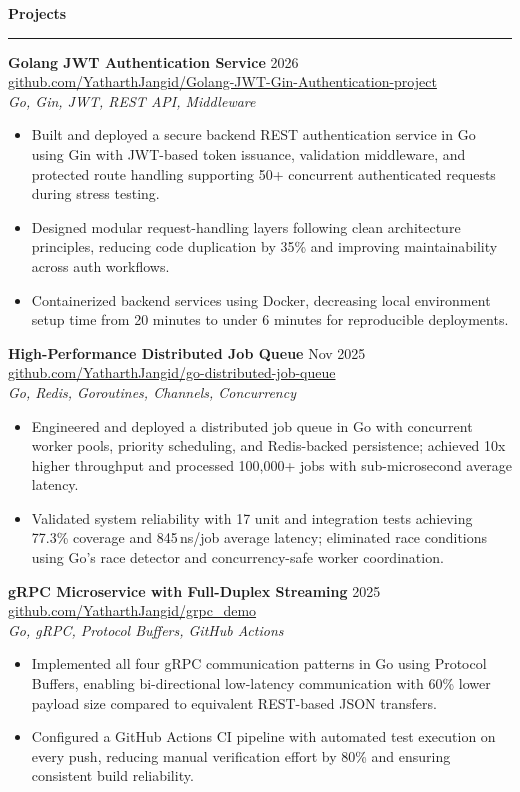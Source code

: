 \documentclass[10pt,a4paper]{article}
\newcommand{\ressection}[1]{%
  \vspace{3pt}%
  {\bfseries\normalsize #1}%
  \vspace{1pt}\hrule\vspace{2pt}%
}
\begin{document}
\ressection{Projects}

\textbf{Golang JWT Authentication Service} \hfill 2026 \hfill
\href{https://github.com/YatharthJangid/Golang-JWT-Gin-Authentication-project}%
     {\small github.com/YatharthJangid/Golang-JWT-Gin-Authentication-project} \\
\textit{Go, Gin, JWT, REST API, Middleware}
\begin{itemize}
  \item Built and deployed a secure backend REST authentication service in Go using Gin with JWT-based
        token issuance, validation middleware, and protected route handling supporting
        50+ concurrent authenticated requests during stress testing.
  \item Designed modular request-handling layers following clean architecture principles,
        reducing code duplication by 35\% and improving maintainability across auth workflows.
  \item Containerized backend services using Docker, decreasing local environment setup
        time from 20 minutes to under 6 minutes for reproducible deployments.
\end{itemize}

\textbf{High-Performance Distributed Job Queue} \hfill Nov 2025 \hfill
\href{https://github.com/YatharthJangid/go-distributed-job-queue}%
     {\small github.com/YatharthJangid/go-distributed-job-queue} \\
\textit{Go, Redis, Goroutines, Channels, Concurrency}
\begin{itemize}
  \item Engineered and deployed a distributed job queue in Go with concurrent worker pools,
        priority scheduling, and Redis-backed persistence; achieved 10x higher
        throughput and processed 100,000+ jobs with sub-microsecond average latency.
  \item Validated system reliability with 17 unit and integration tests achieving
        77.3\% coverage and 845\,ns/job average latency; eliminated race conditions
        using Go's race detector and concurrency-safe worker coordination.
\end{itemize}

\textbf{gRPC Microservice with Full-Duplex Streaming} \hfill 2025 \hfill
\href{https://github.com/YatharthJangid/grpc_demo}%
     {\small github.com/YatharthJangid/grpc\_demo} \\
\textit{Go, gRPC, Protocol Buffers, GitHub Actions}
\begin{itemize}
  \item Implemented all four gRPC communication patterns in Go using Protocol Buffers,
        enabling bi-directional low-latency communication with 60\% lower payload size
        compared to equivalent REST-based JSON transfers.
  \item Configured a GitHub Actions CI pipeline with automated test execution on every
        push, reducing manual verification effort by 80\% and ensuring consistent build reliability.
\end{itemize}
\end{document}
